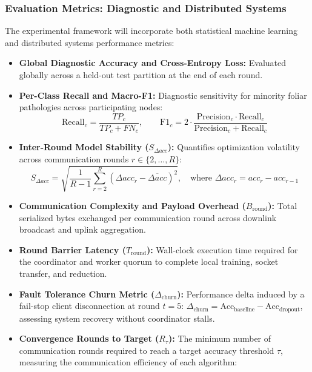 \documentclass[applsci,article,submit,oneauthor,pdftex]{Definitions/mdpi}
\begin{document}
\subsubsection{Evaluation Metrics: Diagnostic and Distributed Systems}
The experimental framework will incorporate both statistical machine learning and distributed systems performance metrics:
\begin{itemize}[leftmargin=*]
    \item \textbf{Global Diagnostic Accuracy and Cross-Entropy Loss:} Evaluated globally across a held-out test partition at the end of each round.
    \item \textbf{Per-Class Recall and Macro-F1:} Diagnostic sensitivity for minority foliar pathologies across participating nodes:
    \begin{equation}
    \mathrm{Recall}_c = \frac{TP_c}{TP_c + FN_c}, \qquad \mathrm{F1}_c = 2 \cdot \frac{\mathrm{Precision}_c \cdot \mathrm{Recall}_c}{\mathrm{Precision}_c + \mathrm{Recall}_c}
    \end{equation}
    \item \textbf{Inter-Round Model Stability ($S_{\Delta acc}$):} Quantifies optimization volatility across communication rounds $r \in \{2, \dots, R\}$:
    \begin{equation}
    S_{\Delta acc} = \sqrt{\frac{1}{R-1} \sum_{r=2}^{R} \left( \Delta acc_r - \overline{\Delta acc} \right)^2}, \quad \text{where } \Delta acc_r = acc_r - acc_{r-1}
    \end{equation}
    \item \textbf{Communication Complexity and Payload Overhead ($B_{\text{round}}$):} Total serialized bytes exchanged per communication round across downlink broadcast and uplink aggregation.
    \item \textbf{Round Barrier Latency ($T_{\text{round}}$):} Wall-clock execution time required for the coordinator and worker quorum to complete local training, socket transfer, and reduction.
    \item \textbf{Fault Tolerance Churn Metric ($\Delta_{\text{churn}}$):} Performance delta induced by a fail-stop client disconnection at round $t=5$: $\Delta_{\text{churn}} = \mathrm{Acc}_{\text{baseline}} - \mathrm{Acc}_{\text{dropout}}$, assessing system recovery without coordinator stalls.
    \item \textbf{Convergence Rounds to Target ($R_{\tau}$):} The minimum number of communication rounds required to reach a target accuracy threshold $\tau$, measuring the communication efficiency of each algorithm:

\end{itemize}
\end{document}
